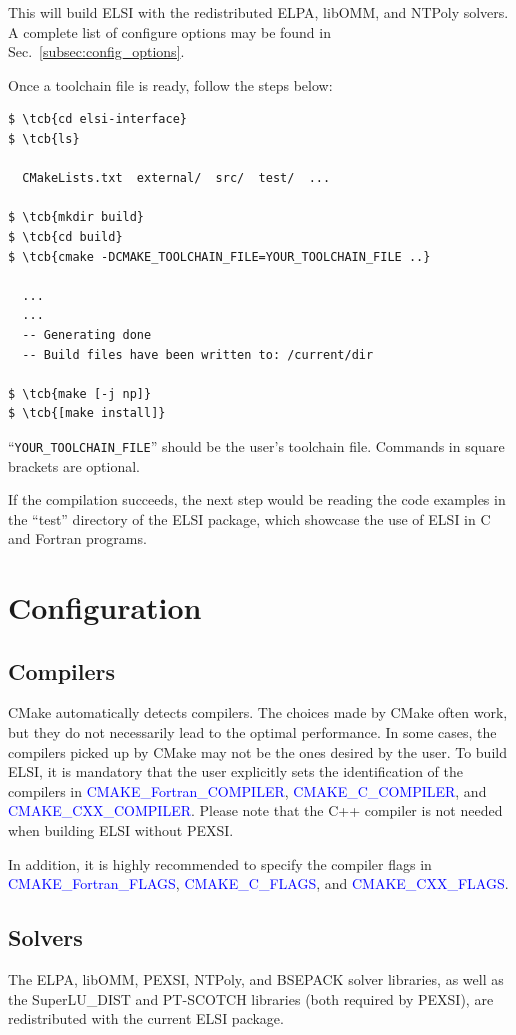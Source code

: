 \documentclass{report}
\newcommand{\tcb}[1]{\textcolor{blue}{#1}}
\begin{document}
This will build ELSI with the redistributed ELPA, libOMM, and NTPoly solvers. A complete list of configure options may be found in Sec.~\ref{subsec:config_options}.

Once a toolchain file is ready, follow the steps below:
\begin{tcolorbox}
\begin{Verbatim}[commandchars=\\\{\}]
$ \tcb{cd elsi-interface}
$ \tcb{ls}

  CMakeLists.txt  external/  src/  test/  ...

$ \tcb{mkdir build}
$ \tcb{cd build}
$ \tcb{cmake -DCMAKE_TOOLCHAIN_FILE=YOUR_TOOLCHAIN_FILE ..}

  ...
  ...
  -- Generating done
  -- Build files have been written to: /current/dir

$ \tcb{make [-j np]}
$ \tcb{[make install]}
\end{Verbatim}
\end{tcolorbox}

``\verb+YOUR_TOOLCHAIN_FILE+'' should be the user's toolchain file. Commands in square brackets are optional.

If the compilation succeeds, the next step would be reading the code examples in the ``test'' directory of the ELSI package, which showcase the use of ELSI in C and Fortran programs.

\section{Configuration}
\label{sec:config}
\subsection{Compilers}
\label{subsec:config_compilers}
CMake automatically detects compilers. The choices made by CMake often work, but they do not necessarily lead to the optimal performance. In some cases, the compilers picked up by CMake may not be the ones desired by the user. To build ELSI, it is mandatory that the user explicitly sets the identification of the compilers in \tcb{CMAKE\_Fortran\_COMPILER}, \tcb{CMAKE\_C\_COMPILER}, and \tcb{CMAKE\_CXX\_COMPILER}. Please note that the C++ compiler is not needed when building ELSI without PEXSI.

In addition, it is highly recommended to specify the compiler flags in \tcb{CMAKE\_Fortran\_FLAGS}, \tcb{CMAKE\_C\_FLAGS}, and \tcb{CMAKE\_CXX\_FLAGS}.

\subsection{Solvers}
\label{subsec:config_solvers}
The ELPA, libOMM, PEXSI, NTPoly, and BSEPACK solver libraries, as well as the SuperLU\_DIST and PT-SCOTCH libraries (both required by PEXSI), are redistributed with the current ELSI package.
\end{document}
